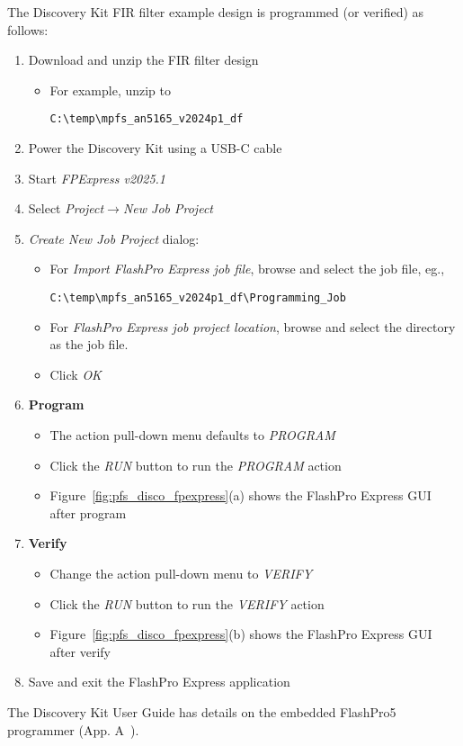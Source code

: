 The Discovery Kit FIR filter example design is programmed (or verified) as follows:
%
\begin{enumerate}
\item Download and unzip the FIR filter design~\cite{Microchip_AN5165_2024}
%
\begin{itemize}
\item For example, unzip to
\begin{verbatim}
C:\temp\mpfs_an5165_v2024p1_df
\end{verbatim}
\end{itemize}
%
\item Power the Discovery Kit using a USB-C cable
\item Start \emph{FPExpress v2025.1}
\item Select \emph{Project$\rightarrow$New Job Project}
\item \emph{Create New Job Project} dialog:
%
\begin{itemize}
\item For \emph{Import FlashPro Express job file}, browse
and select the job file, eg.,
\begin{verbatim}
C:\temp\mpfs_an5165_v2024p1_df\Programming_Job
\end{verbatim}
\item For \emph{FlashPro Express job project location}, browse
and select the directory as the job file.
\item Click \emph{OK}
\end{itemize}
%
\item \textbf{Program}
\begin{itemize}
\item The action pull-down menu defaults to \emph{PROGRAM}
\item Click the \emph{RUN} button to run the \emph{PROGRAM} action
\item Figure~\ref{fig:pfs_disco_fpexpress}(a) shows the FlashPro Express GUI after program
\end{itemize}
%
\item \textbf{Verify}
\begin{itemize}
\item Change the action pull-down menu to \emph{VERIFY}
\item Click the \emph{RUN} button to run the \emph{VERIFY} action
\item Figure~\ref{fig:pfs_disco_fpexpress}(b) shows the FlashPro Express GUI after verify
\end{itemize}
%
\item Save and exit the FlashPro Express application
\end{enumerate}
%
The Discovery Kit User Guide has details on the embedded FlashPro5
programmer (App. A~\cite{Microchip_DISCO_UG_2025}).

